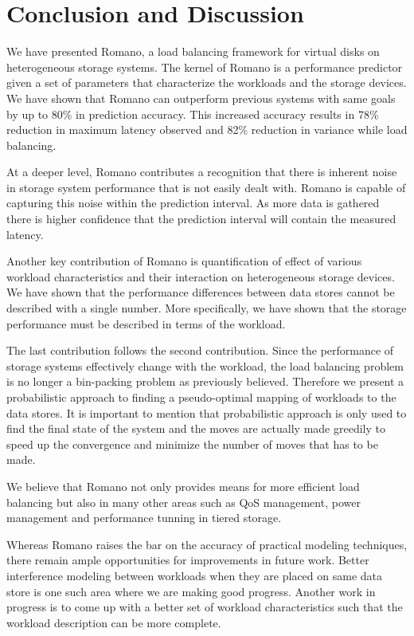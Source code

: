 \chapter{Conclusion and Discussion}
\label{CONCLUSION}
We have presented Romano, a load balancing framework for virtual disks
on heterogeneous storage systems. The kernel of Romano is a performance
predictor given a set of parameters that characterize the workloads and
the storage devices. We have shown that Romano can outperform
previous systems with same goals by up to 80\% in prediction
accuracy. This increased accuracy results in 78\% reduction in maximum
latency observed and 82\% reduction in variance while load balancing.

At a deeper level, Romano contributes a recognition that there is
inherent noise in storage system performance that is not easily dealt
with. Romano is capable of capturing this noise within the prediction
interval. As more data is gathered there is higher confidence that the
prediction interval will contain the measured latency. 

Another key contribution of Romano is quantification of effect of
various workload characteristics and their interaction on heterogeneous
storage devices. 
We have shown that the performance differences between data stores cannot be described with a single number. More specifically, we have shown that the storage performance must be described in terms of the workload.

The last contribution follows the second contribution. Since the performance of storage systems effectively change with the workload, the load balancing problem is no longer a bin-packing problem as previously believed. 
Therefore we present a probabilistic approach to finding a pseudo-optimal mapping of workloads to the data stores. 
It is important to mention that probabilistic approach is only used to find the final state of the system and the moves are actually made greedily to speed up the convergence and minimize the number of moves that has to be made.

We believe that Romano not only provides means for more efficient load
balancing but also in many other areas such as QoS management, power management and performance tunning in tiered storage.

Whereas Romano raises the bar on the accuracy of practical modeling
techniques, there remain ample opportunities for improvements in
future work. Better interference modeling between workloads when they
are placed on same data store is one such area where we are making
good progress. Another work in progress is to come up with a better
set of workload characteristics such that the workload description can
be more complete.
